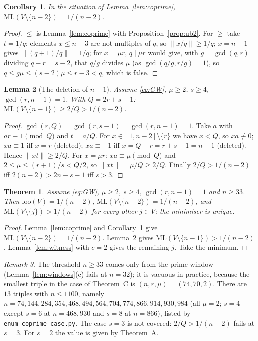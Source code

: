 \documentclass[11pt]{article}
\newtheorem{lemma}{Lemma}
\newtheorem{corollary}[lemma]{Corollary}
\newtheorem{thm}{Theorem}
\theoremstyle{remark}
\newtheorem{remark}[lemma]{Remark}
\newcommand{\norm}[1]{\lVert #1\rVert}
\newcommand{\ML}{\mathrm{ML}}
\newcommand{\loo}{\mathrm{loo}}
\begin{document}
\begin{corollary}\label{cor:ub2}
In the situation of Lemma~\ref{lem:coprime}, $\ML(V\setminus\{n-2\})=1/(n-2)$.
\end{corollary}
\begin{proof}
$\le$ is Lemma~\ref{lem:coprime} with Proposition~\ref{prop:ub2}. For $\ge$ take $t=1/q$: elements $x\le n-3$ are not multiples of $q$, so $\norm{x/q}\ge1/q$; $x=n-1$ gives $\norm{(q+1)/q}=1/q$; for $x=\mu r$, $q\mid\mu r$ would give, with $g=\gcd(q,r)$ dividing $q-r=s-2$, that $q/g$ divides $\mu$ (as $\gcd(q/g,r/g)=1$), so $q\le g\mu\le(s-2)\mu\le r-3<q$, which is false.
\end{proof}

\begin{lemma}[The deletion of $n-1$]\label{lem:D}
Assume \eqref{eq:GW}, $\mu\ge2$, $s\ge4$, $\gcd(r,n-1)=1$. With $Q=2r+s-1$: $\ML(V\setminus\{n-1\})\ge2/Q>1/(n-2)$.
\end{lemma}
\begin{proof}
$\gcd(r,Q)=\gcd(r,s-1)=\gcd(r,n-1)=1$. Take $a$ with $ar\equiv1\pmod Q$ and $t=a/Q$. For $x\in[1,n-2]\setminus\{r\}$ we have $x<Q$, so $xa\not\equiv0$; $xa\equiv1$ iff $x=r$ (deleted); $xa\equiv-1$ iff $x=Q-r=r+s-1=n-1$ (deleted). Hence $\norm{xt}\ge2/Q$. For $x=\mu r$: $xa\equiv\mu\pmod Q$ and $2\le\mu\le(r+1)/s<Q/2$, so $\norm{xt}=\mu/Q\ge2/Q$. Finally $2/Q>1/(n-2)$ iff $2(n-2)>2n-s-1$ iff $s>3$.
\end{proof}

\begin{thm}\label{thm:C}
Assume \eqref{eq:GW}, $\mu\ge2$, $s\ge4$, $\gcd(r,n-1)=1$ and $n\ge33$. Then $\loo(V)=1/(n-2)$, $\ML(V\setminus\{n-2\})=1/(n-2)$, and $\ML(V\setminus\{j\})>1/(n-2)$ for every other $j\in V$; the minimiser is unique.
\end{thm}
\begin{proof}
Lemma~\ref{lem:coprime} and Corollary~\ref{cor:ub2} give $\ML(V\setminus\{n-2\})=1/(n-2)$. Lemma~\ref{lem:D} gives $\ML(V\setminus\{n-1\})>1/(n-2)$. Lemma~\ref{lem:witness} with $c=2$ gives the remaining $j$. Take the minimum.
\end{proof}

\begin{remark}
The threshold $n\ge33$ comes only from the prime window (Lemma~\ref{lem:windows}(c) fails at $n=32$); it is vacuous in practice, because the smallest triple in the case of Theorem~C is $(n,r,\mu)=(74,70,2)$. There are $13$ triples with $n\le1100$, namely $n=74,144,284,354,468,494,564,704,774,866,914,930,984$ (all $\mu=2$; $s=4$ except $s=6$ at $n=468,930$ and $s=8$ at $n=866$), listed by \texttt{enum\_coprime\_case.py}. The case $s=3$ is not covered: $2/Q>1/(n-2)$ fails at $s=3$. For $s=2$ the value is given by Theorem~A.
\end{remark}
\end{document}
